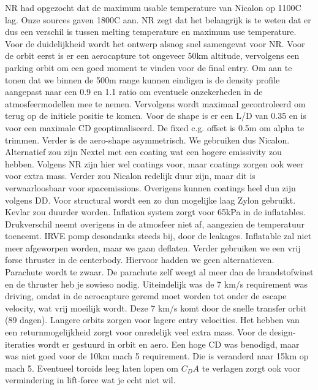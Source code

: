 NR had opgezocht dat de maximum usable temperature van Nicalon op 1100C lag. Onze sources gaven 1800C aan. NR zegt dat het belangrijk is te weten dat er dus een verschil is tussen melting temperature en maximum use temperature. Voor de duidelijkheid wordt het ontwerp alsnog snel samengevat voor NR.
\newline\newline
Voor de orbit eerst is er een aerocapture tot ongeveer 50km altitude, vervolgens een parking orbit om een goed moment te vinden voor de final entry. Om aan te tonen dat we binnen de 500m range kunnen eindigen is de density profile aangepast naar een 0.9 en 1.1 ratio om eventuele onzekerheden in de atmosfeermodellen mee te nemen. Vervolgens wordt maximaal gecontroleerd om terug op de initiele positie te komen.
\newline\newline
Voor de shape is er een L/D van 0.35 en is voor een maximale CD geoptimaliseerd. De fixed c.g. offset is 0.5m om alpha te trimmen. Verder is de aero-shape asymmetrisch.
\newline\newline
We gebruiken dus Nicalon. Alternatief zou zijn Nextel met een coating wat een hogere emissivity zou hebben. Volgens NR zijn hier wel coatings voor, maar coatings zorgen ook weer voor extra mass. Verder zou Nicalon redelijk duur zijn, maar dit is verwaarloosbaar voor spacemissions. Overigens kunnen coatings heel dun zijn volgens DD.
\newline\newline
Voor structural wordt een zo dun mogelijke laag Zylon gebruikt. Kevlar zou duurder worden. Inflation system zorgt voor 65kPa in de inflatables. Drukverschil neemt overigens in de atmosfeer niet af, aangezien de temperatuur toeneemt. IRVE pomp desondanks steeds bij, door de leakages. Inflatable zal niet meer afgeworpen worden, maar we gaan deflaten. Verder gebruiken we een vrij forse thruster in de centerbody. Hiervoor hadden we geen alternatieven. Parachute wordt te zwaar. De parachute zelf weegt al meer dan de brandstofwinst en de thruster heb je sowieso nodig.
\newline\newline
Uiteindelijk was de 7 km/s requirement was driving, omdat in de aerocapture geremd moet worden tot onder de escape velocity, wat vrij moeilijk wordt. Deze 7 km/s komt door de snelle transfer orbit (89 dagen). Langere orbits zorgen voor lagere entry velocities. Het hebben van een returnmogelijkheid zorgt voor onredelijk veel extra mass.
\newline\newline
Voor de design-iteraties wordt er gestuurd in orbit en aero. Een hoge CD was benodigd, maar was niet goed voor de 10km mach 5 requirement. Die is veranderd naar 15km op mach 5. Eventueel toroids leeg laten lopen om $C_DA$ te verlagen zorgt ook voor vermindering in lift-force wat je echt niet wil.

